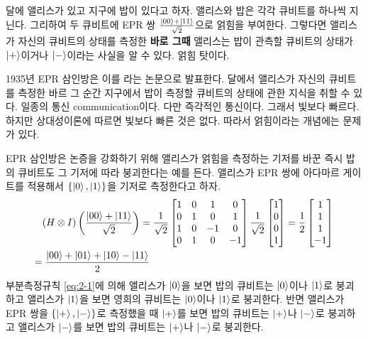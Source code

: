 \documentclass[a4paper,chapter,atbegshi]{oblivoir}
\begin{document}
\begin{mdframed}
달에 앨리스가 있고 지구에 밥이 있다고 하자. 앨리스와 밥은 각각 큐비트를
하나씩 지닌다. 그리하여 두 큐비트에 EPR 쌍 $\frac{\ket{00}+\ket{11}}{\sqrt2}$으로
얽힘을 부여한다. 그렇다면 앨리스가 자신의 큐비트의 상태를 측정한
\textbf{바로 그때} 앨리스는 밥이 관측할 큐비트의 상태가 $\ket{+}$이거나
$\ket{-}$이라는 사실을 알 수 있다. 얽힘 탓이다.
\end{mdframed}

1935년 EPR 삼인방은 이를 라는 논문으로 발표한다. 
달에서 앨리스가 자신의 큐비트를 측정한 바르 그 순간 지구에서 밥이
측정할 큐비트의 상태에 관한 지식을 취할 수 있다. 일종의 통신{\tiny 
communication}이다. 다만 즉각적인 통신이다. 그래서 빛보다 빠르다. 
하지만 상대성이론에 따르면 빛보다 빠른 것은 없다. 따라서 얽힘이라는
개념에는 문제가 있다.

EPR 삼인방은 논증을 강화하기 위해 앨리스가 얽힘을 측정하는 기저를 바꾼
즉시 밥의 큐비트도 그 기저에 따라 붕괴한다는 예를 든다. 앨리스가 EPR 쌍에
아다마르 게이트를 적용해서 $\{\ket0,\ket1\}$을 기저로 측정한다고 하자.
\begin{align*}
  &(H\otimes I)\left(\frac{\ket{00}+\ket{11}}{\sqrt2}\right)
  =\frac{1}{\sqrt2}
  \begin{bmatrix}
    1&0&1&0 \\ 0&1&0&1 \\ 1&0&-1&0 \\0&1&0&-1
  \end{bmatrix}
  \frac{1}{\sqrt2}\begin{bmatrix}1\\0\\0\\1\end{bmatrix}
  =
  \frac{1}{2}\begin{bmatrix}1\\1\\1\\-1\end{bmatrix}\\=&\;
  \frac{\ket{00}+\ket{01}+\ket{10}-\ket{11}}{2} 
\end{align*}
부분측정규칙 \ref{eq:2-1}에 의해 앨리스가 $\ket0$을 보면 밥의 큐비트는
$\ket0$이나 $\ket1$로 붕괴하고 앨리스가 $\ket1$을 보면 영희의 큐비트는 
$\ket0$이나 $\ket1$로 붕괴한다. 반면 앨리스가 EPR 쌍을 $\{\ket+,\ket-\}$로
측정했을 때 $\ket+$를 보면 밥의 큐비트는 $\ket+$나 $\ket-$로 붕괴하고
앨리스가 $\ket-$를 보면 밥의 큐비트는 $\ket+$나 $\ket-$로 붕괴한다.
\end{document}
